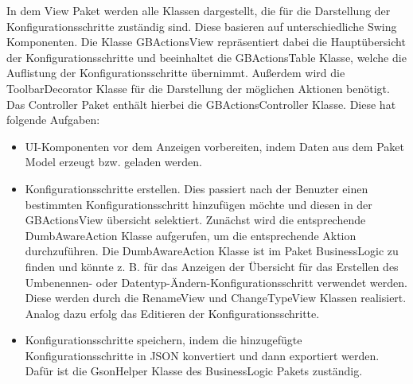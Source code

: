	In dem View Paket werden alle Klassen dargestellt, die für die Darstellung der Konfigurationsschritte zuständig sind. Diese basieren auf unterschiedliche Swing Komponenten. Die Klasse GBActionsView repräsentiert dabei die Hauptübersicht der Konfigurationsschritte und beeinhaltet die GBActionsTable Klasse, welche die Auflistung der Konfigurationsschritte übernimmt. Außerdem wird die ToolbarDecorator Klasse für die Darstellung der möglichen Aktionen benötigt. \\
	Das Controller Paket enthält hierbei die GBActionsController Klasse. Diese hat folgende Aufgaben:
	\begin{itemize}
		\item UI-Komponenten vor dem Anzeigen vorbereiten, indem Daten aus dem Paket Model erzeugt bzw. geladen werden.
		\item Konfigurationsschritte erstellen. Dies passiert nach der Benuzter einen bestimmten Konfigurationsschritt hinzufügen möchte und diesen in der GBActionsView übersicht selektiert. Zunächst wird die entsprechende DumbAwareAction Klasse aufgerufen, um die entsprechende Aktion durchzuführen. Die DumbAwareAction Klasse ist im Paket BusinessLogic zu finden und könnte z. B. für das Anzeigen der Übersicht für das Erstellen des Umbenennen- oder Datentyp-Ändern-Konfigurationsschritt verwendet werden. Diese werden durch die RenameView und ChangeTypeView Klassen realisiert. Analog dazu erfolg das Editieren der Konfigurationsschritte.
		\item Konfigurationsschritte speichern, indem die hinzugefügte Konfigurationsschritte in JSON konvertiert und dann exportiert werden. Dafür ist die GsonHelper Klasse des BusinessLogic Pakets zuständig.
	\end{itemize}
	
	
	
